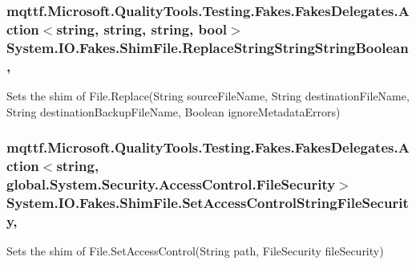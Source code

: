\hypertarget{class_system_1_1_i_o_1_1_fakes_1_1_shim_file_a6aee2c2db0749f686898c7f9e7747404}{
\subsubsection[{Replace\-String\-String\-String\-Boolean}]{\setlength{\rightskip}{0pt plus 5cm}mqttf.\-Microsoft.\-Quality\-Tools.\-Testing.\-Fakes.\-Fakes\-Delegates.\-Action$<$string, string, string, bool$>$ System.\-I\-O.\-Fakes.\-Shim\-File.\-Replace\-String\-String\-String\-Boolean\hspace{0.3cm}{\ttfamily [static]}, {\ttfamily [set]}}}\label{class_system_1_1_i_o_1_1_fakes_1_1_shim_file_a6aee2c2db0749f686898c7f9e7747404}


Sets the shim of File.\-Replace(\-String source\-File\-Name, String destination\-File\-Name, String destination\-Backup\-File\-Name, Boolean ignore\-Metadata\-Errors)

\hypertarget{class_system_1_1_i_o_1_1_fakes_1_1_shim_file_a1d1edca0352c712bc54c2af802d64adb}{
\subsubsection[{Set\-Access\-Control\-String\-File\-Security}]{\setlength{\rightskip}{0pt plus 5cm}mqttf.\-Microsoft.\-Quality\-Tools.\-Testing.\-Fakes.\-Fakes\-Delegates.\-Action$<$string, global.\-System.\-Security.\-Access\-Control.\-File\-Security$>$ System.\-I\-O.\-Fakes.\-Shim\-File.\-Set\-Access\-Control\-String\-File\-Security\hspace{0.3cm}{\ttfamily [static]}, {\ttfamily [set]}}}\label{class_system_1_1_i_o_1_1_fakes_1_1_shim_file_a1d1edca0352c712bc54c2af802d64adb}


Sets the shim of File.\-Set\-Access\-Control(\-String path, File\-Security file\-Security)

